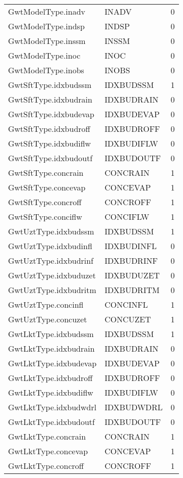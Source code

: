 \begin{longtable}{p{6cm} p{4cm} p{2cm} }
GwtModelType.inadv &  INADV & 0 \\ 
GwtModelType.indsp &  INDSP & 0 \\ 
GwtModelType.inssm &  INSSM & 0 \\ 
GwtModelType.inoc &   INOC  & 0 \\ 
GwtModelType.inobs &  INOBS & 0 \\ 
GwtSftType.idxbudssm &  IDXBUDSSM & 1 \\ 
GwtSftType.idxbudrain &  IDXBUDRAIN & 0 \\ 
GwtSftType.idxbudevap &  IDXBUDEVAP & 0 \\ 
GwtSftType.idxbudroff &  IDXBUDROFF & 0 \\ 
GwtSftType.idxbudiflw &  IDXBUDIFLW & 0 \\ 
GwtSftType.idxbudoutf &  IDXBUDOUTF & 0 \\ 
GwtSftType.concrain &  CONCRAIN & 1 \\ 
GwtSftType.concevap &  CONCEVAP & 1 \\ 
GwtSftType.concroff &  CONCROFF & 1 \\ 
GwtSftType.conciflw &  CONCIFLW & 1 \\ 
GwtUztType.idxbudssm &  IDXBUDSSM & 1 \\ 
GwtUztType.idxbudinfl &  IDXBUDINFL & 0 \\ 
GwtUztType.idxbudrinf &  IDXBUDRINF & 0 \\ 
GwtUztType.idxbuduzet &  IDXBUDUZET & 0 \\ 
GwtUztType.idxbudritm &  IDXBUDRITM & 0 \\ 
GwtUztType.concinfl &  CONCINFL & 1 \\ 
GwtUztType.concuzet &  CONCUZET & 1 \\ 
GwtLktType.idxbudssm &  IDXBUDSSM & 1 \\ 
GwtLktType.idxbudrain &  IDXBUDRAIN & 0 \\ 
GwtLktType.idxbudevap &  IDXBUDEVAP & 0 \\ 
GwtLktType.idxbudroff &  IDXBUDROFF & 0 \\ 
GwtLktType.idxbudiflw &  IDXBUDIFLW & 0 \\ 
GwtLktType.idxbudwdrl &  IDXBUDWDRL & 0 \\ 
GwtLktType.idxbudoutf &  IDXBUDOUTF & 0 \\ 
GwtLktType.concrain &  CONCRAIN & 1 \\ 
GwtLktType.concevap &  CONCEVAP & 1 \\ 
GwtLktType.concroff &  CONCROFF & 1 \\ 

\end{longtable}
